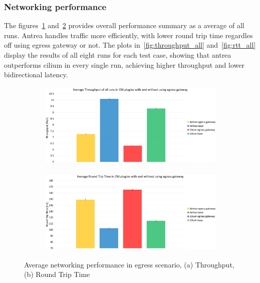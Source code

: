 \subsubsection{Networking performance}
\label{sec:egressNetworkingPerformance}

The figures~\ref{fig:throughput_avg} and~\ref{fig:rtt_avg} provides overall performance summary as a average of all runs. Antrea handles traffic more efficiently, with lower round trip time regardles off using egress gateway or not. The plots in~\ref{fig:throughput_all} and~\ref{fig:rtt_all} display the results of all eight runs for each test case, showing that antrea outperforms cilium in every single run, achieving higher throughput and lower bidirectional latency.

\begin{figure}[H]
    \centering
    \begin{subfigure}[b]{0.7\textwidth}
        \includegraphics[width=\textwidth]{plots/egress/throughput_total_average.png}
        \caption{}
        \label{fig:throughput_avg}
    \end{subfigure}
    \begin{subfigure}[b]{0.7\textwidth}
        \includegraphics[width=\textwidth]{plots/egress/rtt_total_average.png}
        \caption{}
        \label{fig:rtt_avg}
    \end{subfigure}
    
    \caption{Average networking performance in egress scenario, (a) Throughput, (b) Round Trip Time}
    \label{fig:networking_avg}
\end{figure}

